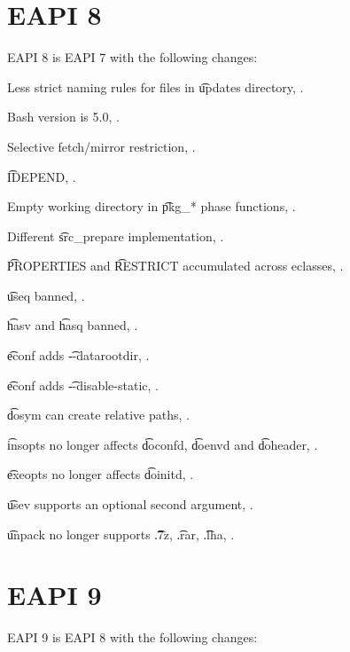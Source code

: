 \section*{EAPI 8}

EAPI 8 is EAPI 7 with the following changes:

\begin{compactitem}
\item Less strict naming rules for files in \t{updates} directory, .
\item Bash version is 5.0, .
\item Selective fetch/mirror restriction, .
\item \t{IDEPEND}, .
\item Empty working directory in \t{pkg_*} phase functions, .
\item Different \t{src_prepare} implementation, .
\item \t{PROPERTIES} and \t{RESTRICT} accumulated across eclasses, .
\item \t{useq} banned, .
\item \t{hasv} and \t{hasq} banned, .
\item \t{econf} adds \t{-{}-datarootdir}, .
\item \t{econf} adds \t{-{}-disable-static}, .
\item \t{dosym} can create relative paths, .
\item \t{insopts} no longer affects \t{doconfd}, \t{doenvd} and \t{doheader}, .
\item \t{exeopts} no longer affects \t{doinitd}, .
\item \t{usev} supports an optional second argument, .
\item \t{unpack} no longer supports \t{.7z}, \t{.rar}, \t{.lha}, .
\end{compactitem}

\section*{EAPI 9}

EAPI 9 is EAPI 8 with the following changes:

